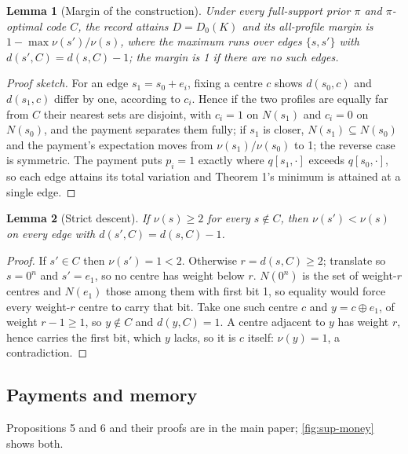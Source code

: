 \documentclass[sigconf,anonymous,acmthm=false]{acmart}
\theoremstyle{acmplain}
\newtheorem{slemma}{Lemma}
\theoremstyle{acmdefinition}
\begin{document}
\begin{slemma}[Margin of the construction]\label{lem:gen-margin}
Under every full-support prior $\pi$ and $\pi$-optimal code $C$, the record attains
$D=D_0(K)$ and its all-profile margin is $1-\max\nu(s')/\nu(s)$, where the maximum runs over
edges $\{s,s'\}$ with $d(s',C)=d(s,C)-1$; the margin is 1 if there are no such edges.
\end{slemma}
\begin{proof}[Proof sketch]
For an edge $s_1=s_0+e_i$, fixing a centre $c$ shows $d(s_0,c)$ and $d(s_1,c)$ differ by
one, according to $c_i$. Hence if the two profiles are equally far from $C$ their nearest
sets are disjoint, with $c_i=1$ on $N(s_1)$ and $c_i=0$ on $N(s_0)$, and the payment
separates them fully; if $s_1$ is closer, $N(s_1)\subseteq N(s_0)$ and the payment's
expectation moves from $\nu(s_1)/\nu(s_0)$ to 1; the reverse case is symmetric. The payment
puts $p_i=1$ exactly where $q[s_1,\cdot]$ exceeds $q[s_0,\cdot]$, so each edge attains its
total variation and Theorem 1's minimum is attained at a single edge.
\end{proof}

\begin{slemma}[Strict descent]\label{lem:strict-descent}
If $\nu(s)\ge2$ for every $s\notin C$, then $\nu(s')<\nu(s)$ on every edge with
$d(s',C)=d(s,C)-1$.
\end{slemma}
\begin{proof}
If $s'\in C$ then $\nu(s')=1<2$. Otherwise $r=d(s,C)\ge2$; translate so $s=0^n$ and
$s'=e_1$, so no centre has weight below $r$. $N(0^n)$ is the set of weight-$r$ centres and
$N(e_1)$ those among them with first bit 1, so equality would force every weight-$r$ centre
to carry that bit. Take one such centre $c$ and $y=c\oplus e_1$, of weight $r-1\ge1$, so
$y\notin C$ and $d(y,C)=1$. A centre adjacent to $y$ has weight $r$, hence carries the first
bit, which $y$ lacks, so it is $c$ itself: $\nu(y)=1$, a contradiction.
\end{proof}

\subsection{Payments and memory}
Propositions 5 and 6 and their proofs are in the main paper; \cref{fig:sup-money} shows both.
\end{document}
